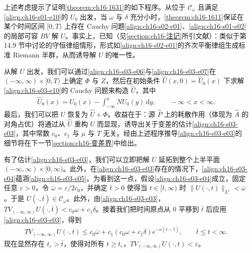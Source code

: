 \documentclass[../../main.tex]{subfiles}
\begin{document}
上述考虑提示了证明\cref{theorem:ch16-1631}的如下程序。从位于 $\mathscr{C}_\omega$ 且满足\eqref{align:ch16-s01-e10}的 $U_0$ 出发，当 $\omega$ 与 $\delta$ 充分小时，\cref{theorem:ch16-1611}保证在某个时间区间 $[0,T)$ 上存在 Cauchy 问题\eqref{align:ch16-s02-e01}、\eqref{align:ch16-s01-e02}的局部可容 $BV$ 解 $U$。事实上，已知（见\cref{section:ch16-注记}所引文献）：类似于第 14.9 节中讨论的守恒律组情形，形式如\eqref{align:ch16-s02-e01}的齐次平衡律组生成标准 Riemann 半群，从而诱导解 $U$ 的唯一性。

从解 $U$ 出发，我们可以通过\eqref{align:ch16-s03-e06}与\eqref{align:ch16-s03-e07}在 $(-\infty,\infty)\times[0,T)$ 上确定 $\Phi$ 与 $Z$，然后在初始条件 $\hat U(x,0)=\hat U_0(x)$ 下求解\eqref{align:ch16-s03-e10}的 Cauchy 问题来构造 $\hat U$，其中
\begin{align}
\hat U_0(x)=U_0(x)-\int_{-\infty}^x NU_0(y)\,\mathrm{d}y,\qquad-\infty<x<\infty.
\label{align:ch16-s03-e15}
\end{align}
最后，我们可以把 $U$ 恢复为 $\hat U+\Phi$。收益在于：源 $\hat P$ 上的耗散作用（体现为 $\hat A$ 的对角占优）将通过从 $\hat U$ 重构 $U$ 而显现，诱导出关于变差的估计\eqref{align:ch16-s03-e03}，其中常数 $c_0$、$c_1$ 与 $\mu$ 与 $T$ 无关。经由上述程序推导\eqref{align:ch16-s03-e03}的细节将在下一节\cref{section:ch16-变差界}中给出。

有了估计\eqref{align:ch16-s03-e03}，我们可以立即把解 $U$ 延拓到整个上半平面 $(-\infty,\infty)\times[0,\infty)$。此外，在\eqref{align:ch16-s03-e03}存在的情况下，\eqref{align:ch16-s03-e04}蕴涵\eqref{align:ch16-s03-e05}。为看到这一点，假设\eqref{align:ch16-s03-e04}成立，固定任意 $\varepsilon>0$，令 $\bar\omega=\varepsilon/2c_0$，并确定 $\bar t>0$ 使得当 $t\in[\bar t,\infty)$ 时 $\|U(\cdot,t)\|_{L^1}<\bar\omega$。于是 $U(\cdot,\bar t)\in\mathscr{C}_{\bar\omega}$。此外，由\eqref{align:ch16-s03-e03}，$TV_{(-\infty,\infty)}U(\cdot,\bar t)<c_0\omega+c_1\delta$。接着我们把时间原点从 $0$ 平移到 $\bar t$ 后应用\eqref{align:ch16-s03-e03}，得到
\begin{align}
TV_{(-\infty,\infty)}U(\cdot,t)\leqslant c_0\bar\omega+c_1(c_0\omega+c_1\delta)e^{-\nu(t-\bar t)},\qquad\bar t\leqslant t<\infty.
\label{align:ch16-s03-e16}
\end{align}
现在显然存在 $t_\varepsilon>\bar t$，使得对所有 $t\geqslant t_\varepsilon$，$TV_{(-\infty,\infty)}U(\cdot,t)<\varepsilon$。
\end{document}
